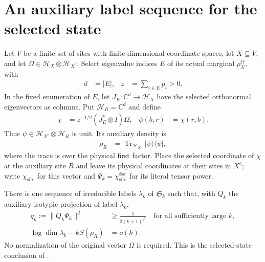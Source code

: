 \section{An auxiliary label sequence for the selected state}

\begin{theorem}
    \label{thm:compressed_typical_label_sequence}
    \leanok
    Let $V$ be a finite set of sites with finite-dimensional coordinate
    spaces, let $X\subseteq V$, and let $\Omega\in\mathcal H_X\otimes
    \mathcal H_{X^c}$. Select eigenvalue indices $E$ of its actual
    marginal $\rho_X^\Omega$, with
    \begin{align*}
        d&=|E|,
        &z&=\sum_{i\in E}p_i>0.
    \end{align*}
    In the fixed enumeration of $E$, let
    $J_E:\mathbb C^d\to\mathcal H_X$ have the selected orthonormal
    eigenvectors as columns. Put $\mathcal H_R=\mathbb C^d$ and define
    \begin{align*}
        \chi&=z^{-1/2}(J_E^*\otimes I)\Omega,
        &\psi(b,r)&=\chi(r,b).
    \end{align*}
    Thus $\psi\in\mathcal H_{X^c}\otimes\mathcal H_R$ is unit. Its
    auxiliary density is
    \begin{align*}
        \rho_R&=\operatorname{Tr}_{\mathcal H_{X^c}}
            |\psi\rangle\langle\psi|,
    \end{align*}
    where the trace is over the physical first factor.
    Place the selected coordinate of $\chi$ at the auxiliary site $R$
    and leave its physical coordinates at their sites in $X^c$; write
    $\chi_{\mathrm{site}}$ for this vector and
    $\Psi_k=\chi_{\mathrm{site}}^{\otimes k}$ for its literal tensor power.

    There is one sequence of irreducible labels $\lambda_k$ of
    $\mathfrak S_k$ such that, with $Q_k$ the auxiliary isotypic
    projection of label $\lambda_k$,
    \begin{align*}
        q_k:=\|Q_k\Psi_k\|^2
        &\ge\frac{1}{2(k+1)^{d^2}}
            \quad\text{for all sufficiently large }k,\\
        \log\dim\lambda_k-kS(\rho_R)&=o(k).
    \end{align*}
    No normalization of the original vector $\Omega$ is required.
    This is the selected-state conclusion of
    \cite[Section~7, lines~255--281]{OpenAI2026AreaLaw}.
\end{theorem}

